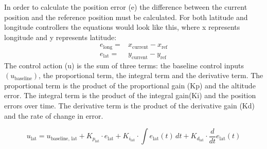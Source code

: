 \documentclass{article}
\begin{document}
In order to calculate the position error (e) the difference between the current position and the reference position must be calculated. For both latitude and longitude controllers
the equations would look like this, where x represents longitude and y represents latitude:
\begin{align}
  e_{\text{long}} =&  x_{\text{current}} - x_{\text{ref}}
  \\
  e_{\text{lat}} =&  y_{\text{current}} - y_{\text{ref}}
\end{align}
The control action (u) is the sum of three terms: the baseline control inputs\((u_{\text{baseline}})\), the proportional
term, the integral term and the derivative term. The proportional term is the product of the proportional gain (Kp) and the
altitude error. The integral term is the product of the integral gain(Ki) and the position errors over time. The derivative term is the product of the derivative gain (Kd) and the rate of change in error.

\begin{equation}
  u_{\text{lat}} = u_{\text{baseline, lat}} + K_{p_{\text{lat}}} \cdot e_{\text{lat}} + K_{i_{\text{lat}}} \cdot \int e_{\text{lat}}(t) \, dt + K_{d_{\text{lat}}} \cdot \frac{d}{dt}e_{\text{lat}}(t)
\end{equation}
\end{document}
